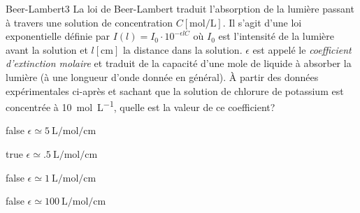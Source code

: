 \documentclass[11pt]{article}
\begin{document}
        \begin{question}{27}{Beer-Lambert}{3}{}
            La loi de Beer-Lambert traduit l'absorption de la lumière passant à travers une solution de concentration $C[\si{\mole\per\liter}]$. Il s'agit d'une loi exponentielle définie par $I(l) = I_0\cdot 10^{-\epsilon l C}$ où $I_0$ est l'intensité de la lumière avant la solution et  $l[\si{\centi\meter}]$ la distance dans la solution. $\epsilon$ est appelé le \emph{coefficient d'extinction molaire} et traduit de la capacité d'une mole de liquide à absorber la lumière (à une longueur d'onde donnée en général). À partir des données expérimentales ci-après et sachant que la solution de chlorure de potassium est concentrée à \SI{10}{\mole\per\liter}, quelle est la valeur de ce coefficient?
            \begin{figure}
             \end{figure}
        \end{question}
        \begin{reponses}
            \item[false] $\epsilon \simeq \SI{5}{\liter\per\mole\per\centi\meter}$
		    \item[true] $\epsilon \simeq \SI{.5}{\liter\per\mole\per\centi\meter}$
		    \item[false] $\epsilon \simeq \SI{1}{\liter\per\mole\per\centi\meter}$
		    \item[false] $\epsilon \simeq \SI{100}{\liter\per\mole\per\centi\meter}$
	    \end{reponses}
		
\end{document}
